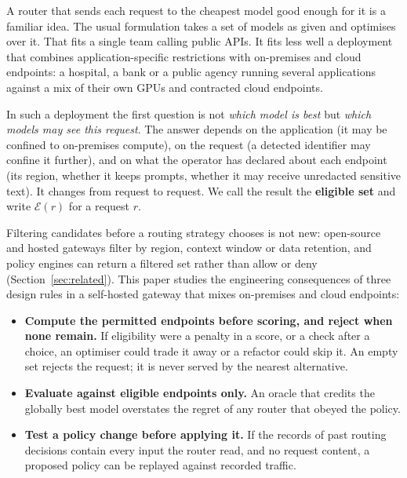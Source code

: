 \documentclass[11pt]{article}
\newcommand{\E}{\mathcal{E}}
\begin{document}
A router that sends each request to the cheapest model good enough for it is a familiar idea.
The usual formulation takes a set of models as given and optimises over it. That fits a single
team calling public APIs. It fits less well a deployment that combines application-specific
restrictions with on-premises and cloud endpoints: a hospital, a bank or a public agency running
several applications against a mix of their own GPUs and contracted cloud endpoints.

In such a deployment the first question is not \emph{which model is best} but \emph{which models
may see this request}. The answer depends on the application (it may be confined to
on-premises compute), on the request (a detected identifier may confine it further), and on what
the operator has declared about each endpoint (its region, whether it keeps prompts, whether it
may receive unredacted sensitive text). It changes from request to request. We call the result
the \textbf{eligible set} and write $\E(r)$ for a request $r$.

Filtering candidates before a routing strategy chooses is not new: open-source and hosted
gateways filter by region, context window or data retention, and policy engines can return a
filtered set rather than allow or deny (Section~\ref{sec:related}). This paper studies the
engineering consequences of three design rules in a self-hosted gateway that mixes on-premises
and cloud endpoints:
\begin{itemize}
  \item \textbf{Compute the permitted endpoints before scoring, and reject when none remain.} If
    eligibility were a penalty in a score, or a check after a choice, an optimiser could trade it
    away or a refactor could skip it. An empty set rejects the request; it is never served by the
    nearest alternative.
  \item \textbf{Evaluate against eligible endpoints only.} An oracle that credits the globally
    best model overstates the regret of any router that obeyed the policy.
  \item \textbf{Test a policy change before applying it.} If the records of past routing
    decisions contain every input the router read, and no request content, a proposed policy can
    be replayed against recorded traffic.
\end{itemize}
\end{document}
